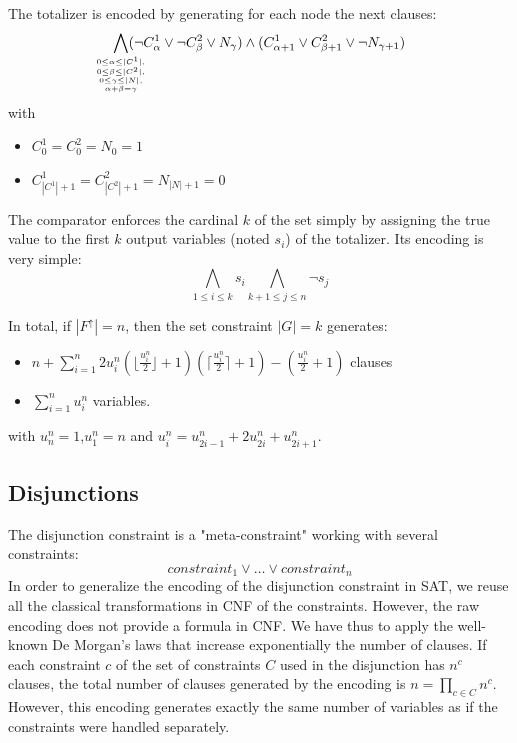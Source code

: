 \documentclass[3p,authoryear,times]{elsarticle}
\newcommand{\MS}[1]{{{#1}^{\uparrow}}}
\newcommand{\MSF}[0]{\MS{F}}
\begin{document}
The totalizer is encoded by generating for each node the next clauses: 
 \[
\bigwedge_{\mathclap{0\leq \alpha \leq|C^1|, \atop {
0\leq \beta \leq|C^2|, \atop{
0\leq \gamma\leq|N|, \atop
\alpha+\beta= \gamma}}}} (\neg C^1_\alpha \vee \neg C^2_\beta \vee N_ \gamma) \wedge  (C^1_{\alpha+1} \vee C^2_{\beta+1} \vee \neg N_{\gamma+1})
\]
with 
\begin{itemize}
\item $C^1_0=C^2_0=N_0=1$
\item $C^1_{|C^1|+1}=C^2_{|C^2|+1}=N_{|N|+1}=0$
\end{itemize}


The comparator enforces the cardinal $k$ of the set simply by assigning the true value to the first $k$ output variables (noted $s_i$) of the totalizer. Its encoding is very simple:
 \[
\bigwedge_{1\leq i \leq k} s_i \bigwedge_{k+1\leq j \leq n} \neg s_j
\]

In total, if $|\MSF|=n$, then the set constraint $|G|=k$ generates:
\begin{itemize}
\item  \textbf{$n+ \sum_{i=1}^{n}{2u_i^{n}(\lfloor \frac{u_i^{n}}{2}\rfloor+1)(\lceil \frac{u_i^{n}}{2}\rceil+1)-(\frac{u_i^{n}}{2}+1)} $} clauses 
\item \textbf{$\sum_{i=1}^{n}{u_i^n}$} variables.
\end{itemize}
with $u_n^n=1$,$u_1^n=n$ and  $u_i^n=u_{2i-1}^n+2u_{2i}^n+u_{2i+1}^n$. 

\subsection{Disjunctions}
\label{enc:disjunction}
The disjunction constraint is a "meta-constraint" working with several constraints:
$$ constraint_1 \vee \ldots \vee constraint_n$$
In order to generalize the encoding of the disjunction constraint in SAT, we reuse all the classical transformations in CNF of the constraints. However, the raw encoding does not provide a formula in CNF. We have thus to apply the well-known De Morgan's laws that increase exponentially the number of clauses. %
If each constraint $c$ of the set of constraints  $C$ used in the disjunction has $n^c$ clauses, the total number of clauses generated by the encoding is $n=\prod_{c \in C}n^c$.
However, this encoding generates exactly the same number of variables as if the constraints were handled separately.
\end{document}
